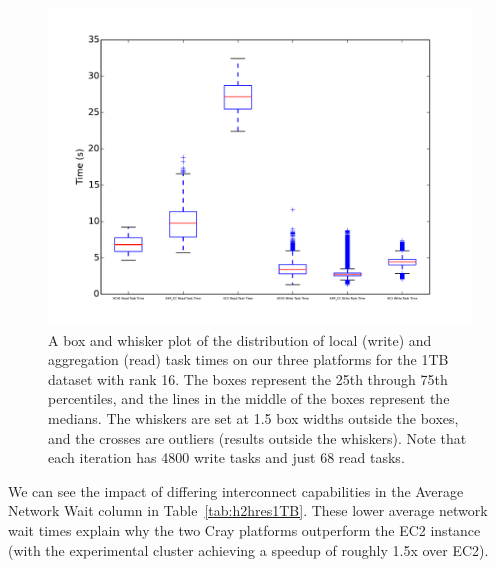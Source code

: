    \begin{figure} [H]
    \begin{centering}
    \includegraphics[scale=0.4]{images/boxplot_read_write_task_Rank_16_1T_default_partitions.pdf}
    \end{centering}
    \caption{A box and whisker plot of the distribution of local (write) and aggregation (read) task times on our three platforms for the 1TB dataset with rank 16.  The boxes represent the 25th through 75th percentiles, and the lines in the middle of the boxes represent the medians.  The whiskers are set at 1.5 box widths outside the boxes, and the crosses are outliers (results outside the whiskers).  Note that each iteration has 4800 write tasks and just 68 read tasks.}
    \label{fig:rwtaskdist} 
    \end{figure}

We can see the impact of differing interconnect capabilities in the Average Network Wait column in Table~\ref{tab:h2hres1TB}.   These lower average network wait times explain why the two Cray platforms outperform the EC2 instance (with the experimental cluster achieving a speedup of roughly 1.5x over EC2).  

